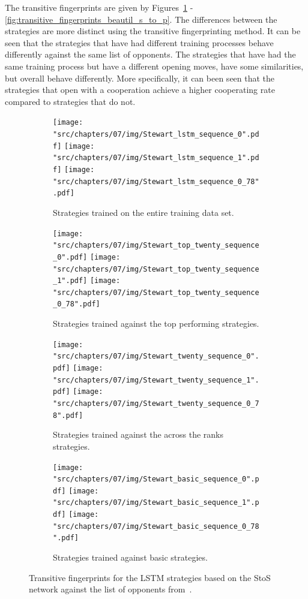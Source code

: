 The transitive fingerprints are given by
Figures~\ref{fig:transitive_fingerprints_stewart_s_to_s}
-\ref{fig:transitive_fingerprints_beautil_s_to_p}. The differences between the
strategies are more distinct using the transitive fingerprinting method. It can
be seen that the strategies that have had different training processes behave
differently against the same list of opponents. The strategies that have had the
same training process but have a different opening moves, have some
similarities, but overall behave differently. More specifically, it can been
seen that the strategies that open with a cooperation achieve a higher
cooperating rate compared to strategies that do not.

\begin{figure}[!htbp]
    \begin{subfigure}{\textwidth}
        \texttt{[image: "src/chapters/07/img/Stewart\_lstm\_sequence\_0".pdf]}
        \texttt{[image: "src/chapters/07/img/Stewart\_lstm\_sequence\_1".pdf]}
        \texttt{[image: "src/chapters/07/img/Stewart\_lstm\_sequence\_0\_78".pdf]}
        \caption{Strategies trained on the entire training data set.}
    \end{subfigure}
    \begin{subfigure}{\textwidth}
        \texttt{[image: "src/chapters/07/img/Stewart\_top\_twenty\_sequence\_0".pdf]}
        \texttt{[image: "src/chapters/07/img/Stewart\_top\_twenty\_sequence\_1".pdf]}
        \texttt{[image: "src/chapters/07/img/Stewart\_top\_twenty\_sequence\_0\_78".pdf]}
        \caption{Strategies trained against the top performing strategies.}
    \end{subfigure}
    \begin{subfigure}{\textwidth}
        \texttt{[image: "src/chapters/07/img/Stewart\_twenty\_sequence\_0".pdf]}
        \texttt{[image: "src/chapters/07/img/Stewart\_twenty\_sequence\_1".pdf]}
        \texttt{[image: "src/chapters/07/img/Stewart\_twenty\_sequence\_0\_78".pdf]}
        \caption{Strategies trained against the across the ranks strategies.}
    \end{subfigure}
    \begin{subfigure}{\textwidth}
        \texttt{[image: "src/chapters/07/img/Stewart\_basic\_sequence\_0".pdf]}
        \texttt{[image: "src/chapters/07/img/Stewart\_basic\_sequence\_1".pdf]}
        \texttt{[image: "src/chapters/07/img/Stewart\_basic\_sequence\_0\_78".pdf]}
        \caption{Strategies trained against basic strategies.}
    \end{subfigure}
    \caption{Transitive fingerprints for the LSTM strategies based on the StoS
    network against the list of opponents from~\cite{Stewart2012}.}\label{fig:transitive_fingerprints_stewart_s_to_s}
\end{figure}


